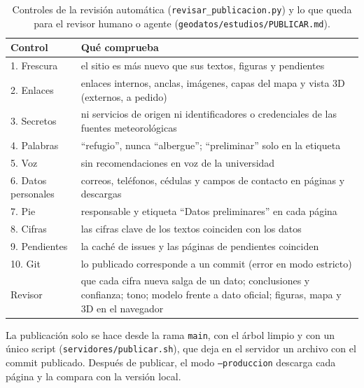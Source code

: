 \documentclass{sosg-informe}
\begin{document}
\begin{table}[ht]
  \centering\small
  \caption{Controles de la revisión automática (\texttt{revisar\_publicacion.py}) y lo que queda para el revisor humano o agente (\texttt{geodatos/estudios/PUBLICAR.md}).}
  \label{tab:revision}
  \begin{tabularx}{\linewidth}{l>{\raggedright\arraybackslash}X}
    \toprule
    Control & Qué comprueba \\
    \midrule
    1. Frescura & el sitio es más nuevo que sus textos, figuras y pendientes \\
    2. Enlaces & enlaces internos, anclas, imágenes, capas del mapa y vista 3D (externos, a pedido) \\
    3. Secretos & ni servicios de origen ni identificadores o credenciales de las fuentes meteorológicas \\
    4. Palabras & \enquote{refugio}, nunca \enquote{albergue}; \enquote{preliminar} solo en la etiqueta \\
    5. Voz & sin recomendaciones en voz de la universidad \\
    6. Datos personales & correos, teléfonos, cédulas y campos de contacto en páginas y descargas \\
    7. Pie & responsable y etiqueta \enquote{Datos preliminares} en cada página \\
    8. Cifras & las cifras clave de los textos coinciden con los datos \\
    9. Pendientes & la caché de issues y las páginas de pendientes coinciden \\
    10. Git & lo publicado corresponde a un commit (error en modo estricto) \\
    \midrule
    Revisor & que cada cifra nueva salga de un dato; conclusiones y confianza; tono; modelo frente a dato oficial; figuras, mapa y 3D en el navegador \\
    \bottomrule
  \end{tabularx}
\end{table}

La publicación solo se hace desde la rama \texttt{main}, con el árbol limpio y con un único script (\texttt{servidores/publicar.sh}), que deja en el servidor un archivo con el commit publicado. Después de publicar, el modo \texttt{--produccion} descarga cada página y la compara con la versión local.
\end{document}
